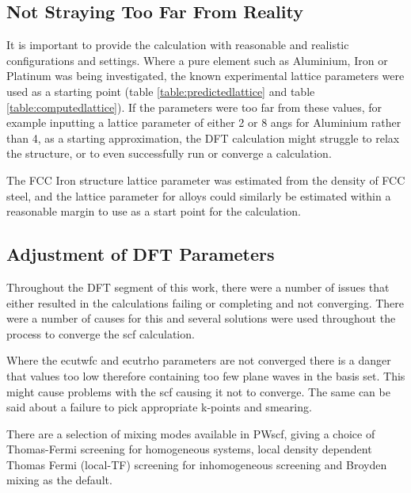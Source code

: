 \subsection{Not Straying Too Far From Reality}

It is important to provide the calculation with reasonable and realistic configurations and settings.  Where a pure element such as Aluminium, Iron or Platinum was being investigated, the known experimental lattice parameters were used as a starting point (table \ref{table:predictedlattice} and table \ref{table:computedlattice}).  If the parameters were too far from these values, for example inputting a lattice parameter of either 2 or 8 angs for Aluminium rather than 4, as a starting approximation, the DFT calculation might struggle to relax the structure, or to even successfully run or converge a calculation.

The FCC Iron structure lattice parameter was estimated from the density of FCC steel, and the lattice parameter for alloys could similarly be estimated within a reasonable margin to use as a start point for the calculation.



\subsection{Adjustment of DFT Parameters}

Throughout the DFT segment of this work, there were a number of issues that either resulted in the calculations failing or completing and not converging.  There were a number of causes for this and several solutions were used throughout the process to converge the \acrshort{scf} calculation.

Where the ecutwfc and ecutrho parameters are not converged there is a danger that values too low therefore containing too few plane waves in the basis set.  This might cause problems with the \acrshort{scf} causing it not to converge.  The same can be said about a failure to pick appropriate k-points and smearing.

There are a selection of mixing modes available in PWscf, giving a choice of Thomas-Fermi screening for homogeneous systems, local density dependent Thomas Fermi (local-TF) screening for inhomogeneous screening and Broyden mixing as the default.  

